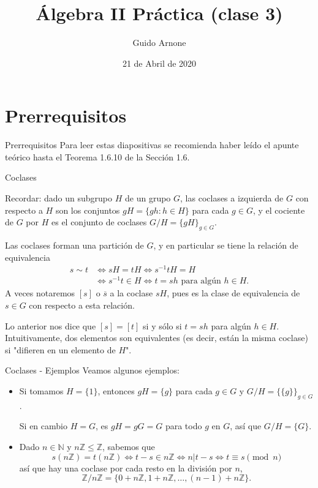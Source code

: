 \documentclass{beamer}
\title[Álgebra II Práctica (clase 3)] {Álgebra II Práctica (clase 3)}
\author[G. Arnone]{Guido Arnone}
\institute[]{Universidad de Buenos Aires}
\date[2020/04/21]{21 de Abril de 2020}
\def\N{\mathbb{N}}
\def\Z{\mathbb{Z}}
\begin{document}
{
\begin{frame}
\titlepage
\end{frame}
}

\section{Prerrequisitos}
\begin{frame}{Prerrequisitos}
Para leer estas diapositivas se recomienda haber leído el apunte teórico hasta el Teorema 1.6.10 de la Sección 1.6.

\medskip

\end{frame}

\begin{frame}{Coclases}
  
   Recordar: dado un subgrupo $H$ de un grupo $G$, las \alert{coclases a izquierda} de $G$ con respecto a $H$ son los conjuntos $gH = \{gh : h \in H\}$ para cada $g \in G$, y el \alert{cociente} de $G$ por $H$ es el conjunto de coclases $G/H = \{gH\}_{g \in G}$. \medskip
  
   Las coclases forman una partición de $G$, y en particular se  tiene la relación de equivalencia
  \begin{align*}
    s \sim t &\iff sH = tH \iff s^{-1}tH = H\\
    &\iff s^{-1}t \in H \iff t = sh \text{ para algún $h \in H$.}
  \end{align*}
   A veces notaremos $[s]$ o $\overline{s}$ a la coclase $sH$, pues es la clase de equivalencia de $s \in G$ con respecto a esta relación.
  
   Lo anterior nos dice que $[s] = [t]$ si y sólo si $t = sh$ para algún $h \in H$. Intuitivamente, dos elementos son equivalentes (es decir, están la misma coclase) si "difieren en un elemento de $H$". 
  
\end{frame}

\begin{frame}{Coclases - Ejemplos}
  Veamos algunos ejemplos:
  \medskip
  \begin{itemize}
  \item Si tomamos $H = \{1\}$, entonces $gH = \{g\}$ para cada $g \in G$ y $G/H = \{\{g\}\}_{g \in G}$. 
  
  Si en cambio $H = G$, es $gH = gG = G$ para todo $g$ en $G$, así que $G/H = \{G\}$. 
  \medskip
  \item Dado $n \in \N$ y $n\Z \leq \Z$, sabemos que
  \[
    s(n\Z) = t(n\Z) \iff t-s \in n\Z \iff n|t-s \iff t \equiv s \pmod{n}
  \]
  así que hay una coclase por cada resto en la división por $n$,
  \[
  \Z/n\Z = \{0 + n\Z,1+n\Z,\dots, (n-1) + n\Z\}.
  \] 
  \end{itemize}
\end{frame}
\end{document}
